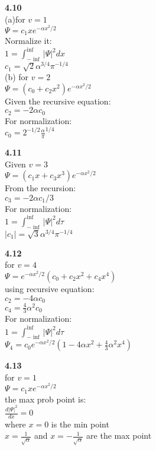 \documentclass{article}
\begin{document}
\textbf{4.10}\\
(a)for $v = 1$\\
$\Psi = c_1xe^{-\alpha x^2/2}$\\
Normalize it:\\
$1 = \int_{-\inf}^{\inf}|\Psi|^2dx$\\
$c_1 = \sqrt{2}\alpha^{3/4}\pi^{-1/4}$\\
(b) for $v = 2$\\
$\Psi = (c_0 + c_2x^2)e^{-\alpha x^2/2}$\\
Given the recursive equation:\\
$c_2 = -2\alpha c_0$\\
For normalization:\\
$c_0 = 2^{-1/2}\frac{\alpha}{\pi}^{1/4}$\\
\newline

\textbf{4.11}\\
Given $v = 3$\\
$\Psi = (c_1x+c_3x^3)e^{-\alpha x^2/2}$\\
From the recursion:\\
$c_3 = -2\alpha c_1 / 3$\\
For normalization:\\
$1 = \int_{-\inf}^{\inf}|\Psi|^2d\tau$\\
$|c_1| = \sqrt{3}\alpha^{3/4}\pi^{-1/4}$\\
\newline

\textbf{4.12}\\
for $v=4$\\
$\Psi = e^{-\alpha x^2/2}(c_0 + c_2x^2 + c_4x^4)$\\
using recursive equation:\\
$c_2 = -4\alpha c_0$\\
$c_4 = \frac{4}{3}\alpha^2 c_0$\\
For normalization:\\
$1 = \int_{-\inf}^{\inf}|\Psi|^2d\tau$\\
$\Psi_4 = c_0e^{-\alpha x^2/2}(1 - 4\alpha x^2 + \frac{4}{3}\alpha^2x^4)$\\
\newline

\textbf{4.13}\\
for $v = 1$\\
$\Psi = c_1xe^{-\alpha x^2/2}$\\
the max prob point is:\\
$\frac{d|\Psi|^2}{dx} = 0$\\
where $x = 0$ is the min point\\
$x = \frac{1}{\sqrt{\alpha}}$ and $x = -\frac{1}{\sqrt{\alpha}}$ are the max point\\
\newline
\end{document}
